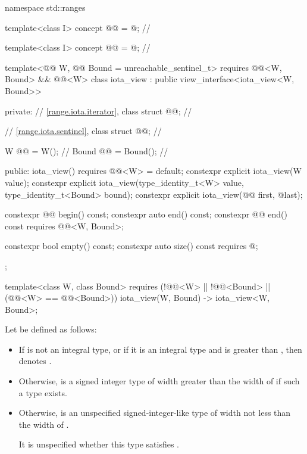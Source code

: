 %
\begin{codeblock}
namespace std::ranges {
  template<class I>
    concept @@ = @\seebelownc@;  // \expos

  template<class I>
    concept @@ = @\seebelownc@;    // \expos

  template<@@ W, @@ Bound = unreachable_sentinel_t>
    requires @@<W, Bound> && @@<W>
  class iota_view : public view_interface<iota_view<W, Bound>> {
  private:
    // \ref{range.iota.iterator}, class 
    struct @@;                    // \expos

    // \ref{range.iota.sentinel}, class 
    struct @@;                    // \expos

    W @@ = W();                     // \expos
    Bound @@ = Bound();             // \expos

  public:
    iota_view() requires @@<W> = default;
    constexpr explicit iota_view(W value);
    constexpr explicit iota_view(type_identity_t<W> value, type_identity_t<Bound> bound);
    constexpr explicit iota_view(@@ first, @\seebelow@ last);

    constexpr @@ begin() const;
    constexpr auto end() const;
    constexpr @@ end() const requires @@<W, Bound>;

    constexpr bool empty() const;
    constexpr auto size() const requires @\seebelow@;
  };

  template<class W, class Bound>
    requires (!@@<W> || !@@<Bound> ||
              (@@<W> == @@<Bound>))
    iota_view(W, Bound) -> iota_view<W, Bound>;
}
\end{codeblock}

\pnum
Let  be defined as follows:
\begin{itemize}
\item
  If  is not an integral type, or
  if it is an integral type and 
  is greater than ,
  then  denotes .
\item
  Otherwise, 
  is a signed integer type of width greater than the width of 
  if such a type exists.
\item
  Otherwise, 
  is an unspecified signed-integer-like type
  of width not less than the width of .
  \begin{note}
  It is unspecified
  whether this type satisfies .
  \end{note}
\end{itemize}

